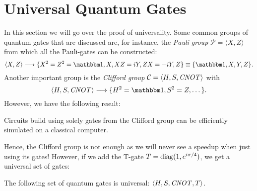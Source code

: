 	\section{Universal Quantum Gates}
		In this section we will go over the proof of universality. Some common groups of quantum gates that are discussed are, for instance, the \emph{Pauli group} \( \mathcal{P} = \langle X, Z \rangle \) from which all the Pauli-gates can be constructed:
		\begin{equation}
			\langle X, Z \rangle
			\longto \{ X^2 = Z^2 = \ID, X, XZ = iY, ZX = -iY, Z \}
			\equiv \{ \ID, X, Y, Z \}.
		\end{equation}
		Another important group is the \emph{Clifford group} \( \mathcal{C} = \langle H, S, \mathit{CNOT} \rangle \) with
		\begin{equation}
			\langle H, S, \CNOT \rangle
			\longto \{ H^2 = \ID, S^2 = Z, \dots \}.
		\end{equation}
		However, we have the following result:
		\begin{theorem}
			Circuits build using solely gates from the Clifford group can be efficiently simulated on a classical computer.
		\end{theorem}
		Hence, the Clifford group is not enough as we will never see a speedup when just using its gates! However, if we add the T-gate \( T = \operatorname{diag}(1, e^{i \pi / 4}) \), we get a universal set of gates:
		\begin{theorem}
			The following set of quantum gates is universal: \( \langle H, S, \mathit{CNOT}, T \rangle \).
		\end{theorem}
